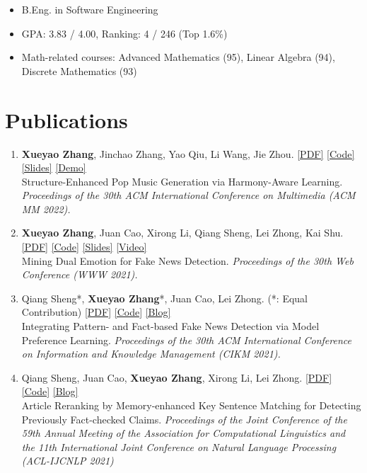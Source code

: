 \documentclass{resume}
\begin{document}
{
  \small 
\begin{itemize}
  \item B.Eng. in Software Engineering
  \item GPA: 3.83 / 4.00, Ranking: 4 / 246 (Top 1.6\%)
  \item Math-related courses: Advanced Mathematics (95), Linear Algebra (94), Discrete Mathematics (93)
\end{itemize}
}


\section{Publications}

\begin{enumerate}\itemsep 0.5em
  \item \textbf{Xueyao Zhang}, Jinchao Zhang, Yao Qiu, Li Wang, Jie Zhou. \href{https://dl.acm.org/doi/10.1145/3503161.3548084}{[PDF]} \href{https://github.com/RMSnow/HAT}{[Code]} \href{https://www.zhangxueyao.com/data/HAT/slides.pdf}{[Slides]} \href{https://www.zhangxueyao.com/data/HAT/demo.html}{[Demo]}\\Structure-Enhanced Pop Music Generation via Harmony-Aware Learning. \textit{Proceedings of the 30th ACM International Conference on Multimedia (ACM MM 2022).}
  \item \textbf{Xueyao Zhang}, Juan Cao, Xirong Li, Qiang Sheng, Lei Zhong, Kai Shu. \href{https://dl.acm.org/doi/pdf/10.1145/3442381.3450004}{[PDF]} \href{https://github.com/RMSnow/WWW2021}{[Code]} \href{https://www.zhangxueyao.com/assets/www2021-dual-emotion-slides.pdf}{[Slides]} \href{https://www.bilibili.com/video/BV13o4y1m7c3}{[Video]}\\ Mining Dual Emotion for Fake News Detection. \textit{Proceedings of the 30th Web Conference (WWW 2021).}
  \item Qiang Sheng*, \textbf{Xueyao Zhang}*, Juan Cao, Lei Zhong.  (*: Equal Contribution) \href{https://dl.acm.org/doi/10.1145/3459637.3482440}{[PDF]} \href{https://github.com/ICTMCG/Pref-FEND}{[Code]} \href{https://zhuanlan.zhihu.com/p/414464291}{[Blog]}\\Integrating Pattern- and Fact-based Fake News Detection via Model Preference Learning. \textit{Proceedings of the 30th ACM International Conference on Information and Knowledge Management (CIKM 2021).}
  \item Qiang Sheng, Juan Cao, \textbf{Xueyao Zhang}, Xirong Li, Lei Zhong. \href{https://aclanthology.org/2021.acl-long.425.pdf}{[PDF]} \href{https://github.com/ICTMCG/MTM}{[Code]} \href{https://zhuanlan.zhihu.com/p/393615707}{[Blog]}\\Article Reranking by Memory-enhanced Key Sentence Matching for Detecting Previously Fact-checked Claims. \textit{Proceedings of the Joint Conference of the 59th Annual Meeting of the Association for Computational Linguistics and the 11th International Joint Conference on Natural Language Processing (ACL-IJCNLP 2021) }

\end{enumerate}
\end{document}

